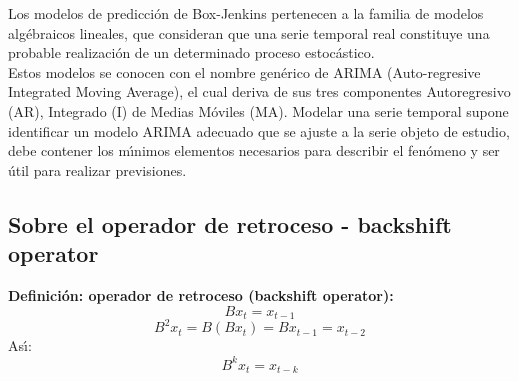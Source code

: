 


Los modelos de predicci\'on de Box-Jenkins pertenecen a la familia de modelos alg\'ebraicos lineales, que consideran que una serie temporal real constituye una probable realizaci\'on de un determinado proceso estoc\'astico.\\
\vspace{4mm}	
Estos modelos se conocen con el nombre gen\'erico de ARIMA (Auto-regresive Integrated Moving Average), el cual deriva de sus tres componentes Autoregresivo (AR), Integrado (I) de Medias M\'oviles (MA). Modelar una serie temporal supone identificar un modelo ARIMA adecuado que se ajuste a la serie objeto de estudio, debe contener los m\'{\i}nimos elementos necesarios para describir el fen\'omeno y ser \'util para realizar previsiones.

\subsection{Sobre el operador de retroceso - backshift operator}
\begin{mdframed}[style=MyFrame]
\begin{definition}\label{def}
	\textbf{Definici\'on: operador de retroceso (backshift operator):}
		\begin{equation}
		B x_t = x_{t-1} 
		\end{equation}
		\begin{equation}
		B^2 x_t =  B(B x_t) = B x_{t-1} = x_{t-2}
		\end{equation}
		As\'{\i}:
		\begin{equation}
		B^k x_t = x_{t-k} 
		\end{equation} 
\end{definition}
\end{mdframed}

%		

